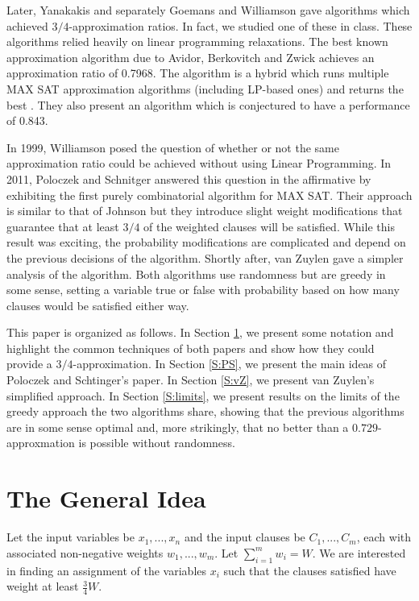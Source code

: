 \documentclass[11pt,letter]{article}
\numberwithin{theorem}{section}
\begin{document}
Later, Yanakakis \cite{Yannakakis1994475} and separately Goemans and Williamson \cite{Goemans94new3/4-approximation}
gave algorithms which achieved $3/4$-approximation ratios. In fact, we studied one of these in class.
These algorithms relied heavily on linear programming relaxations. The best known approximation algorithm due to Avidor, Berkovitch
and Zwick achieves an approximation ratio of 0.7968. The algorithm is a hybrid which runs multiple MAX SAT approximation algorithms
(including LP-based ones) and returns the best \cite{Avidor:2005:IAA:2105211.2105214}. They also present an algorithm which is conjectured to have a performance of 0.843.

In 1999, Williamson posed the question
of whether or not the same approximation ratio could be achieved without using Linear Programming. In 2011,
Poloczek and Schnitger \cite{Poloczek:2011:RVJ:2133036.2133087} answered this question in the affirmative
by exhibiting the first purely combinatorial algorithm for MAX SAT. Their approach is similar to that of Johnson
but they introduce slight weight modifications that guarantee that at least $3/4$ of the weighted clauses will be satisfied.
While this result was exciting, the probability modifications are complicated and depend on the previous decisions
of the algorithm. Shortly after, van Zuylen \cite{vanZuylen:2011:SAM:2238496.2238512} gave a simpler analysis of the algorithm.
Both algorithms use randomness but are greedy in some sense,
setting a variable true or false with probability based on
how many clauses would be satisfied either way.

This paper is organized as follows.
In Section \ref{S:idea}, we present some notation and highlight the common techniques of both papers
and show how they could provide a $3/4$-approximation.
In Section \ref{S:PS}, we present the main ideas of Poloczek and Schtinger's paper.
In Section \ref{S:vZ}, we present van Zuylen's simplified approach.
In Section \ref{S:limits}, we present results on the limits of
the greedy approach the two algorithms share,
showing that the previous algorithms are in some sense optimal
and, more strikingly,
that no better than a $0.729$-approxmation is possible without randomness.


\section{The General Idea}\label{S:idea}

Let the input variables be $x_1,...,x_n$ and the input clauses be $C_1,...,C_m$,
each with associated non-negative weights $w_1,...,w_m$. Let $\sum_{i=1}^{m} w_i = W$.
We are interested in finding an assignment of the variables $x_i$ such that the clauses satisfied have weight at least $\frac{3}{4}W$.
\end{document}
